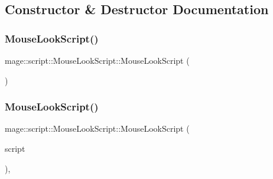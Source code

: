 \subsection{Constructor \& Destructor Documentation}
\hypertarget{classmage_1_1script_1_1_mouse_look_script_a9055e93385160f4074cd2bc7fda3869e}{}\label{classmage_1_1script_1_1_mouse_look_script_a9055e93385160f4074cd2bc7fda3869e} 
\subsubsection{\texorpdfstring{Mouse\+Look\+Script()}{MouseLookScript()}\hspace{0.1cm}{\footnotesize\ttfamily [1/3]}}
{\footnotesize\ttfamily mage\+::script\+::\+Mouse\+Look\+Script\+::\+Mouse\+Look\+Script (\begin{DoxyParamCaption}{ }\end{DoxyParamCaption})}

\hypertarget{classmage_1_1script_1_1_mouse_look_script_aa5237c229f27fa29f820bf6517209444}{}\label{classmage_1_1script_1_1_mouse_look_script_aa5237c229f27fa29f820bf6517209444} 
\subsubsection{\texorpdfstring{Mouse\+Look\+Script()}{MouseLookScript()}\hspace{0.1cm}{\footnotesize\ttfamily [2/3]}}
{\footnotesize\ttfamily mage\+::script\+::\+Mouse\+Look\+Script\+::\+Mouse\+Look\+Script (\begin{DoxyParamCaption}\item[{const \hyperlink{classmage_1_1script_1_1_mouse_look_script}{Mouse\+Look\+Script} \&}]{script }\end{DoxyParamCaption})\hspace{0.3cm}{\ttfamily [default]}, {\ttfamily [noexcept]}}

\hypertarget{classmage_1_1script_1_1_mouse_look_script_ac21a383d6718ccc0d6c9faa5c5c1fe50}{}\label{classmage_1_1script_1_1_mouse_look_script_ac21a383d6718ccc0d6c9faa5c5c1fe50} 
